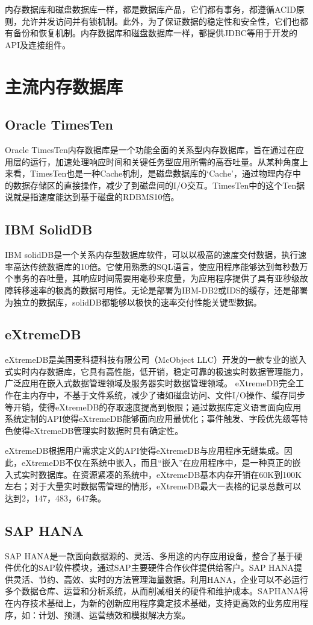 \documentclass[literaturereview]{zjutreport}
\begin{document}
内存数据库和磁盘数据库一样，都是数据库产品，它们都有事务，都遵循ACID原则，允许并发访问并有锁机制。此外，为了保证数据的稳定性和安全性，它们也都有备份和恢复机制。内存数据库和磁盘数据库一样，都提供JDBC等用于开发的API及连接组件。

\chapter{主流内存数据库}
\section{Oracle TimesTen}
Oracle TimesTen内存数据库是一个功能全面的关系型内存数据库，旨在通过在应用层的运行，加速处理响应时间和关键任务型应用所需的高吞吐量。从某种角度上来看，TimesTen也是一种Cache机制，是磁盘数据库的‘Cache’，通过物理内存中的数据存储区的直接操作，减少了到磁盘间的I/O交互。TimesTen中的这个Ten据说就是指速度能达到基于磁盘的RDBMS10倍。

\section{IBM SolidDB}
IBM solidDB是一个关系内存型数据库软件，可以以极高的速度交付数据，执行速率高达传统数据库的10倍。它使用熟悉的SQL语言，使应用程序能够达到每秒数万个事务的吞吐量，其响应时间需要用毫秒来度量，为应用程序提供了具有亚秒级故障转移速率的极高的数据可用性。无论是部署为IBM-DB2或IDS的缓存，还是部署为独立的数据库，solidDB都能够以极快的速率交付性能关键型数据。

\section{eXtremeDB}
eXtremeDB是美国麦科捷科技有限公司（McObject LLC）开发的一款专业的嵌入式实时内存数据库，它具有高性能，低开销，稳定可靠的极速实时数据管理能力，广泛应用在嵌入式数据管理领域及服务器实时数据管理领域。
eXtremeDB完全工作在主内存中，不基于文件系统，减少了诸如磁盘访问、文件I/O操作、缓存同步等开销，使得eXtremeDB的存取速度提高到极限；通过数据库定义语言面向应用系统定制的API使得eXtremeDB能够面向应用最优化；事件触发、字段优先级等特色使得eXtremeDB管理实时数据时具有确定性。

eXtremeDB根据用户需求定义的API使得eXtremeDB与应用程序无缝集成。因此，eXtremeDB不仅在系统中嵌入，而且“嵌入”在应用程序中，是一种真正的嵌入式实时数据库。在资源紧凑的系统中，eXtremeDB基本内存开销在60K到100K左右；对于大量实时数据需管理的情形，eXtremeDB最大一表格的记录总数可以达到2，147，483，647条。

\section{SAP HANA}
SAP HANA是一款面向数据源的、灵活、多用途的内存应用设备，整合了基于硬件优化的SAP软件模块，通过SAP主要硬件合作伙伴提供给客户。SAP HANA提供灵活、节约、高效、实时的方法管理海量数据。利用HANA，企业可以不必运行多个数据仓库、运营和分析系统，从而削减相关的硬件和维护成本。SAPHANA将在内存技术基础上，为新的创新应用程序奠定技术基础，支持更高效的业务应用程序，如：计划、预测、运营绩效和模拟解决方案。
\end{document}
